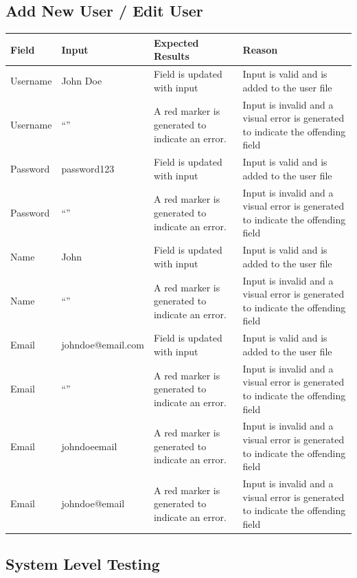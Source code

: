 \documentclass[oneside,openany,11pt,a4paper]{report}
\begin{document}
\subsection{Add New User / Edit User}
\begin{longtable}{|p{3cm}|p{3cm}|p{4.5cm}|p{4.5cm}|}
	\hline
	\rowcolor{gray!50}
	\textbf{Field} & \textbf{Input} &  \textbf{Expected Results} & \textbf{Reason} \\ \hline
	
	Username & John Doe &	Field is updated with input &	Input is valid and is added to the user file \\ \hline
	Username &	“” &	A red marker is generated to indicate an error.	& Input is invalid and a visual error is generated to indicate the offending field \\ \hline
	Password & password123 & Field is updated with input & Input is valid and is added to the user file \\ \hline
	Password & “” & A red marker is generated to indicate an error. & Input is invalid and a visual error is generated to indicate the offending field \\ \hline
	Name & John	& Field is updated with input &Input is valid and is added to the user file \\ \hline
	Name & “” & A red marker is generated to indicate an error. & Input is invalid and a visual error is generated to indicate the offending field \\ \hline
	Email &johndoe@email.com & Field is updated with input & Input is valid and is added to the user file \\ \hline
	Email & “” & A red marker is generated to indicate an error. & Input is invalid and a visual error is generated to indicate the offending field \\ \hline
	Email & johndoeemail & A red marker is generated to indicate an error. & Input is invalid and a visual error is generated to indicate the offending field \\ \hline
	Email & johndoe@email & A red marker is generated to indicate an error. & Input is invalid and a visual error is generated to indicate the offending field \\ \hline
	
\end{longtable}

\subsection{System Level Testing}
\end{document}
